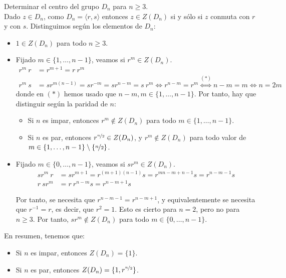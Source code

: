 \begin{ejercicio}
    Determinar el centro del grupo $D_n$ para $n\geq 3$.\\

    Dado $z\in D_n$, como $D_n=\langle r,s\rangle$ entonces $z\in Z(D_n)$ si y sólo si $z$ conmuta con $r$ y con $s$.
    Distinguimos según los elementos de $D_n$:
    \begin{itemize}
        \item $1\in Z(D_n)$ para todo $n\geq 3$.
        \item Fijado $m\in\{1,\ldots,n-1\}$, veamos si $r^m\in Z(D_n)$.
        \begin{align*}
            r^m\ r &= r^{m+1} = r\ r^m\\
            r^m\ s &= sr^{m(n-1)} = sr^{-m} = sr^{n-m} = s\ r^m\iff r^{n-m}=r^m
            \stackrel{(\ast)}{\iff} n-m=m\iff n=2m
        \end{align*}
        donde en $(\ast)$ hemos usado que $n-m,m\in\{1,\ldots,n-1\}$. Por tanto, hay que distinguir según la paridad de $n$:
        \begin{itemize}
            \item Si $n$ es impar, entonces $r^m \notin Z(D_n)$ para todo $m\in\{1,\ldots,n-1\}$.
            \item Si $n$ es par, entonces $r^{\nicefrac{n}{2}}\in Z(D_n)$, y $r^m\notin Z(D_n)$ para todo valor de $m\in\{1,\ldots,n-1\}\setminus \{\nicefrac{n}{2}\}$.
        \end{itemize}

        \item Fijado $m\in\{0,\ldots,n-1\}$, veamos si $sr^m\in Z(D_n)$.
        \begin{align*}
            sr^m\ r &= sr^{m+1} = r^{(m+1)(n-1)}s = r^{mn -m + n -1}s = r^{n-m-1}s\\
            r\ sr^m &= r\ r^{n-m}s = r^{n-m+1}s
        \end{align*}

        Por tanto, se necesita que $r^{n-m-1}=r^{n-m+1}$, y equivalentemente se necesita que $r^{-1}=r$, es decir, que $r^2=1$. Esto es cierto para $n=2$, pero no para $n\geq 3$. Por tanto, $sr^m\notin Z(D_n)$ para todo $m\in\{0,\ldots,n-1\}$.
    \end{itemize}

    En resumen, tenemos que:
    \begin{itemize}
        \item Si $n$ es impar, entonces $Z(D_n)=\{1\}$.
        \item Si $n$ es par, entonces $Z(D_n)=\{1,r^{\nicefrac{n}{2}}\}$.
    \end{itemize}
\end{ejercicio}

